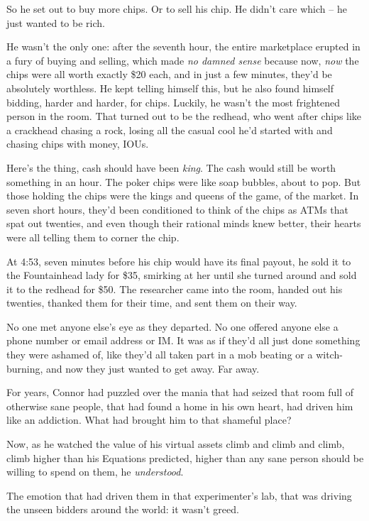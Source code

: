 So he set out to buy more chips. Or to sell his chip. He didn't
care which -- he just wanted to be rich.

He wasn't the only one: after the seventh hour, the entire
marketplace erupted in a fury of buying and selling, which made
\emph{no damned sense} because now, \emph{now} the chips were all
worth exactly \$20 each, and in just a few minutes, they'd be
absolutely worthless. He kept telling himself this, but he also
found himself bidding, harder and harder, for chips. Luckily, he
wasn't the most frightened person in the room. That turned out to
be the redhead, who went after chips like a crackhead chasing a
rock, losing all the casual cool he'd started with and chasing
chips with money, IOUs.

Here's the thing, cash should have been \emph{king}. The cash would
still be worth something in an hour. The poker chips were like soap
bubbles, about to pop. But those holding the chips were the kings
and queens of the game, of the market. In seven short hours, they'd
been conditioned to think of the chips as ATMs that spat out
twenties, and even though their rational minds knew better, their
hearts were all telling them to corner the chip.

At 4:53, seven minutes before his chip would have its final payout,
he sold it to the Fountainhead lady for \$35, smirking at her until
she turned around and sold it to the redhead for \$50. The
researcher came into the room, handed out his twenties, thanked
them for their time, and sent them on their way.

No one met anyone else's eye as they departed. No one offered
anyone else a phone number or email address or IM. It was as if
they'd all just done something they were ashamed of, like they'd
all taken part in a mob beating or a witch-burning, and now they
just wanted to get away. Far away.

For years, Connor had puzzled over the mania that had seized that
room full of otherwise sane people, that had found a home in his
own heart, had driven him like an addiction. What had brought him
to that shameful place?

Now, as he watched the value of his virtual assets climb and climb
and climb, climb higher than his Equations predicted, higher than
any sane person should be willing to spend on them, he
\emph{understood}.

The emotion that had driven them in that experimenter's lab, that
was driving the unseen bidders around the world: it wasn't greed.

